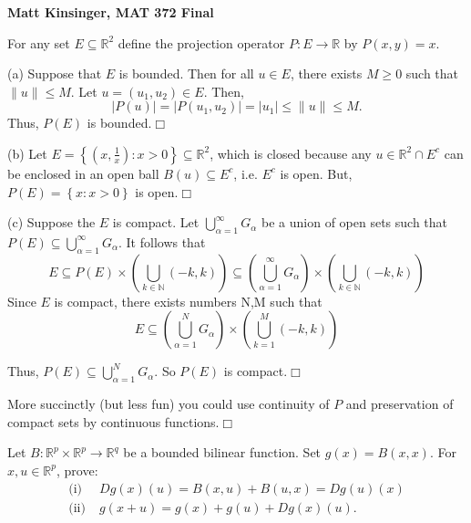 \documentclass[11pt]{article}
\begin{document}
\vspace*{-.6in}

\begin{center}
{\Large\bf Matt Kinsinger, MAT 372 Final}

\end{center}

\vspace{.5in} 

\noindent {\bf [1]} For any set $E\subseteq \mathbb{R}^2$ define the projection operator $P:E\rightarrow\mathbb{R}$ by $P(x,y)=x$.

\vspace{.2in}

\noindent (a) Suppose that $E$ is bounded. Then for all $u\in E$, there exists $M\geq 0$ such that $\|u\|\leq M$. Let $u=(u_1,u_2)\in E$. Then,
\[
|P(u)|=|P(u_1,u_2)|=|u_1|\leq \|u\|\leq M.
\]
Thus, $P(E)$ is bounded.\hfill $\Box$

\vspace{.2in}

\noindent (b) Let $E=\left\{(x,\frac{1}{x}):x>0\right\}\subseteq\mathbb{R}^2$, which is closed because any $u\in\mathbb{R}^2\cap E^c$ can be enclosed in an open ball $B(u)\subseteq E^c$, i.e. $E^c$ is open. But, $P(E)=\left\{x:x>0\right\}$ is open.\hfill $\Box$

\vspace{.2in}

\noindent (c) Suppose the $E$ is compact. Let $\bigcup\limits_{\alpha =1}^\infty G_\alpha$ be a union of open sets such that $P(E)\subseteq\bigcup\limits_{\alpha =1}^\infty G_\alpha$. It follows that
\[
E\subseteq P(E)\times\left(\bigcup\limits_{k\in\mathbb{N}}(-k,k)\right)\subseteq \left(\bigcup\limits_{\alpha =1}^\infty G_\alpha\right)\times \left(\bigcup\limits_{k\in\mathbb{N}}(-k,k)\right)
\] 
Since $E$ is compact, there exists numbers N,M such that 
\[
E\subseteq \left(\bigcup\limits_{\alpha =1}^N G_\alpha\right)\times \left(\bigcup\limits_{k=1}^M(-k,k)\right)
\]

\noindent Thus, $P(E)\subseteq \bigcup\limits_{\alpha =1}^N G_\alpha$. So $P(E)$ is compact.\hfill $\Box$

\vspace{.2in}

\noindent More succinctly (but less fun) you could use continuity of $P$ and preservation of compact sets by continuous functions.\hfill $\Box$

\vspace{.5in}

\noindent {\bf [2]} Let $B:\mathbb{R}^p\times\mathbb{R}^p\rightarrow\mathbb{R}^q$ be a bounded bilinear function. Set $g(x)=B(x,x)$. For $x,u\in\mathbb{R}^p$, prove:
\begin{align*}
\text{(i)}&\;Dg(x)(u)=B(x,u)+B(u,x)=Dg(u)(x)\\\text{(ii)}&\;g(x+u)=g(x)+g(u)+Dg(x)(u).
\end{align*}
\end{document}
